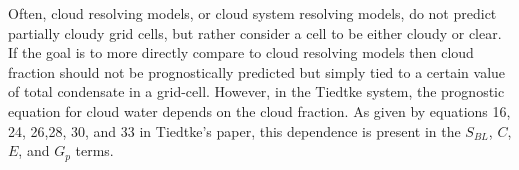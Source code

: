\documentclass[11pt]{article}   	%
\begin{document}
Often, cloud resolving models, or cloud system resolving models, do not predict partially cloudy grid cells, but rather consider a cell to be either cloudy or clear.  If the goal is to more directly compare to cloud resolving models then cloud fraction should not be prognostically predicted but simply tied to a certain value of total condensate in a grid-cell.  However, in the Tiedtke system, the prognostic equation for cloud water depends on the cloud fraction.  As given by equations 16, 24, 26,28, 30, and 33 in Tiedtke's paper, this dependence is present in the $S_{BL}$, $C$, $E$, and $G_{p}$ terms. 
\end{document}

